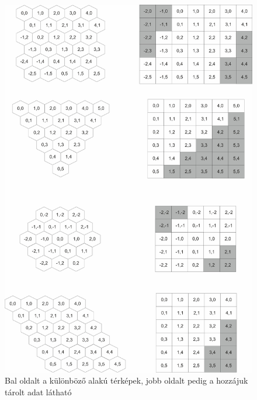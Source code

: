 \begin{figure}[h!]
\centering
\includegraphics[scale=0.2]{kepek/StorageProblem.jpg}
\caption{Bal oldalt a különböző alakú térképek, jobb oldalt pedig a hozzájuk tárolt adat látható}
\label{fig:StorageProblem}
\end{figure}

